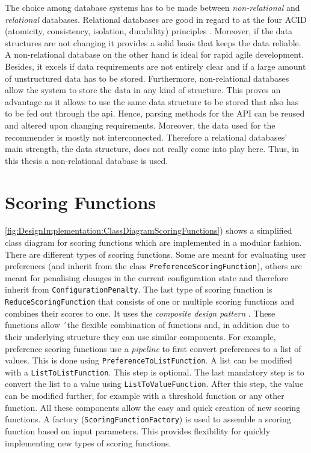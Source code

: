 The choice among database systems has to be made between \emph{non-relational} and \emph{relational} databases. Relational databases are good in regard to at the four ACID (atomicity, consistency, isolation, durability) principles \cite{chrysanthis1998recovery, cookACIDBASEDatabase2009}. Moreover, if the data structures are not changing it provides a solid basis that keeps the data reliable. A non-relational database on the other hand is ideal for rapid agile development. Besides, it excels if data requirements are not entirely clear and if a large amount of unstructured  data has to be stored. Furthermore, non-relational databases allow the system to store the data in any kind of structure. This proves an advantage as it allows to use the same data structure to be stored that also has to be fed out through the api. Hence, parsing methods for the API can be reused and altered upon changing requirements. Moreover, the data used for the recommender is mostly not interconnected. Therefore a relational databases' main strength, the data structure, does not really come into play here. Thus, in this thesis a non-relational database is used. 

\section{Scoring Functions}
\label{sec:DesignImplementation:ScroingFunctions}

\autoref{fig:DesignImplementation:ClassDiagramScoringFunctions}) shows a simplified class diagram for scoring functions which are implemented in a modular fashion. There are different types of scoring functions. Some are meant for evaluating user preferences (and inherit from the class \texttt{PreferenceScoringFunction}), others are meant for penalising changes in the current configuration state and therefore inherit from  \texttt{ConfigurationPenalty}. The last type of scoring function is \texttt{ReduceScoringFunction} that consists of one or multiple scoring functions and combines their scores to one. It uses the \emph{composite design pattern} \cite{gamma2015design}. These functions allow ´the flexible combination of functions and, in addition due to their underlying structure they can use similar components. For example, preference scoring functions use a \emph{pipeline} \cite{gamma2015design} to first convert preferences to a list of values. This is done using \texttt{PreferenceToListFunction}. A list can be modified with a \texttt{ListToListFunction}. This step is optional. The last mandatory step is to convert the list to a value using \texttt{ListToValueFunction}. After this step, the value can be modified further, for example with a threshold function or any other function. All these components allow the easy and quick creation of new scoring functions. A factory (\texttt{ScoringFunctionFactory}) is used to assemble a scoring function based on input parameters. This provides flexibility for quickly implementing new types of scoring functions.

